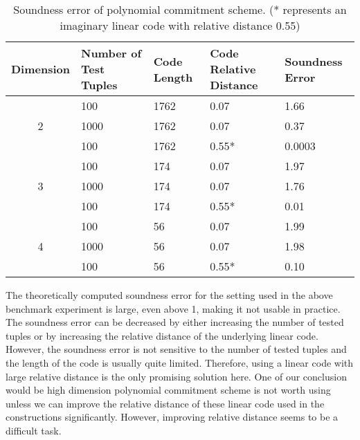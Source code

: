 \begin{table}[h!]
\centering
\begin{tabular}{| c | m{5em} | m{5em} | m{5em}  | m{5em}|} 
 \hline
 Dimension & Number of Test Tuples & Code Length & Code Relative Distance & Soundness Error \\ [0.5ex] 
 \hline\hline
 
 \multirow{3}{*}{2} & 100 & 1762 & 0.07 & 1.66  \\
  & 1000 & 1762 & 0.07 & 0.37  \\
  & 100 & 1762 & 0.55* & 0.0003  \\
 \hline
 
 \multirow{3}{*}{3} & 100 & 174  & 0.07 & 1.97 \\
 & 1000 & 174  & 0.07 & 1.76 \\
 & 100 & 174  & 0.55* & 0.01 \\
 \hline
 
 \multirow{3}{*}{4} & 100 & 56   & 0.07 & 1.99  \\
  & 1000 & 56   & 0.07 & 1.98  \\
  & 100 & 56   & 0.55* & 0.10  \\ 
 \hline
\end{tabular}
\caption{Soundness error of polynomial commitment scheme. (* represents an imaginary linear code with relative distance 0.55)}
\label{table:benchmark-pc-3}
\end{table}

The theoretically computed soundness error for the setting used in the above benchmark experiment is large, even above 1, making it not usable in practice. The soundness error can be decreased by either increasing the number of tested tuples or by increasing the relative distance of the underlying linear code. However, the soundness error is not sensitive to the number of tested tuples and the length of the code is usually quite limited. Therefore, using a linear code with large relative distance is the only promising solution here. One of our conclusion would be high dimension polynomial commitment scheme is not worth using unless we can improve the relative distance of these linear code used in the constructions significantly. However, improving relative distance seems to be a difficult task.
